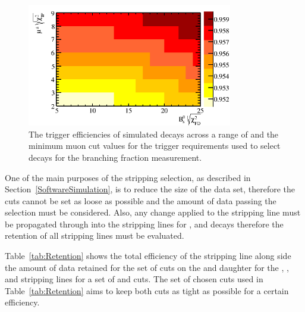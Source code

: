 \begin{figure}[htbp]
   \centering
        \includegraphics[width=0.8\textwidth]{./Figs/Selection/trigger_chart.png}
    \caption{The trigger efficiencies of \bsmumu simulated decays across a range of \bs \chiFD and the minimum muon \chiIP cut values for the trigger requirements used to select \bmumu decays for the branching fraction measurement. }
    \label{fig:triggereffplots}
\end{figure}





One of the main purposes of the stripping selection, as described in Section~\ref{SoftwareSimulation}, is to reduce the size of the data set, therefore the cuts cannot be set as loose as possible and the amount of data passing the selection must be considered. Also, any change applied to the \bmumu stripping line must be propagated through into the stripping lines for \bhh, \bujpsik and \bsjpsiphi decays therefore the retention of all stripping lines must be evaluated.

Table~\ref{tab:Retention} shows the total efficiency of the \bsmumu stripping line along side the amount of data retained for the set of cuts on the \chiFD and daughter \chiIP for the \bmumu, \bhh, \bujpsik and \bsjpsiphi stripping lines for a set of \chiIP and \chiFD cuts. %
The set of chosen cuts used in Table~\ref{tab:Retention} aims to keep both cuts as tight as possible for a certain \bsmumu efficiency. 



